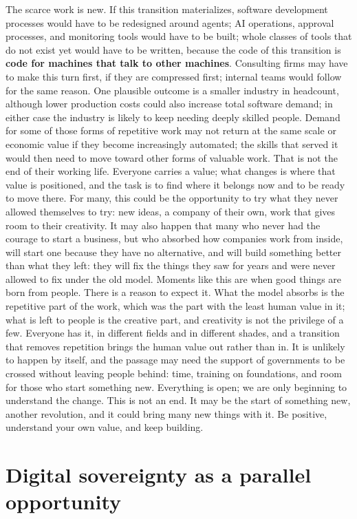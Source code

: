 \documentclass[10pt,oneside,openany]{book}
\begin{document}
The scarce work is new. If this transition materializes, software development processes would have to be redesigned around agents; AI operations, approval processes, and monitoring tools would have to be built; whole classes of tools that do not exist yet would have to be written, because the code of this transition is \textbf{code for machines that talk to other machines}. Consulting firms may have to make this turn first, if they are compressed first; internal teams would follow for the same reason. One plausible outcome is a smaller industry in headcount, although lower production costs could also increase total software demand; in either case the industry is likely to keep needing deeply skilled people. Demand for some of those forms of repetitive work may not return at the same scale or economic value if they become increasingly automated; the skills that served it would then need to move toward other forms of valuable work. That is not the end of their working life. Everyone carries a value; what changes is where that value is positioned, and the task is to find where it belongs now and to be ready to move there. For many, this could be the opportunity to try what they never allowed themselves to try: new ideas, a company of their own, work that gives room to their creativity. It may also happen that many who never had the courage to start a business, but who absorbed how companies work from inside, will start one because they have no alternative, and will build something better than what they left: they will fix the things they saw for years and were never allowed to fix under the old model. Moments like this are when good things are born from people. There is a reason to expect it. What the model absorbs is the repetitive part of the work, which was the part with the least human value in it; what is left to people is the creative part, and creativity is not the privilege of a few. Everyone has it, in different fields and in different shades, and a transition that removes repetition brings the human value out rather than in. It is unlikely to happen by itself, and the passage may need the support of governments to be crossed without leaving people behind: time, training on foundations, and room for those who start something new. Everything is open; we are only beginning to understand the change. This is not an end. It may be the start of something new, another revolution, and it could bring many new things with it. Be positive, understand your own value, and keep building.

\section{Digital sovereignty as a parallel opportunity}\label{sec:sovereignty}
\end{document}
